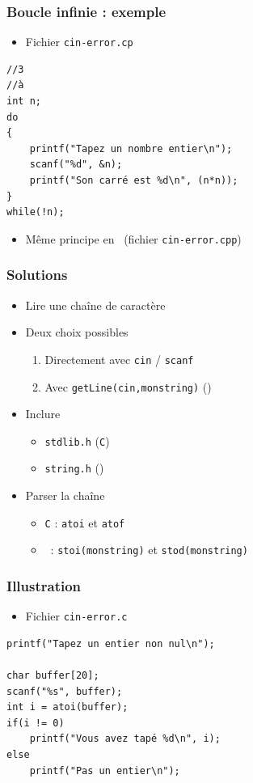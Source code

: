 \begin{frame}[containsverbatim]
\frametitle{Boucle infinie : exemple}
\begin{itemize}
\item Fichier \texttt{cin-error.cp}
\end{itemize}
\begin{lstlisting}
//3
//à
int n;
do
{
	printf("Tapez un nombre entier\n");
	scanf("%d", &n);
	printf("Son carré est %d\n", (n*n));
}
while(!n);
\end{lstlisting}
\begin{itemize}
\item Même principe en \cpp~(fichier \texttt{cin-error.cpp})
\end{itemize}
\end{frame}

\begin{frame}
\frametitle{Solutions}
\begin{itemize}[<+->]
\item Lire une chaîne de caractère
\item Deux choix possibles
	\begin{enumerate}
	\item Directement avec \texttt{cin} / \texttt{scanf}
	\item Avec \texttt{getLine(cin,monstring)} (\cpp)
	\end{enumerate}
\item Inclure 
	\begin{itemize}
	\item \texttt{stdlib.h} (\texttt{C})
	\item \texttt{string.h} (\cpp)
	\end{itemize}	
\item Parser la chaîne
	\begin{itemize}
	\item \texttt{C} : \texttt{atoi} et \texttt{atof}
	\item \cpp\ : \texttt{stoi(monstring)} et \texttt{stod(monstring)}	
	\end{itemize}
\end{itemize}
\end{frame}

\begin{frame}[containsverbatim]
\frametitle{Illustration}
\begin{itemize}
\item Fichier \texttt{cin-error.c}
\end{itemize}
\begin{lstlisting}
printf("Tapez un entier non nul\n");
        
char buffer[20];
scanf("%s", buffer);
int i = atoi(buffer);
if(i != 0)
    printf("Vous avez tapé %d\n", i);
else
    printf("Pas un entier\n");
\end{lstlisting}
\end{frame}

